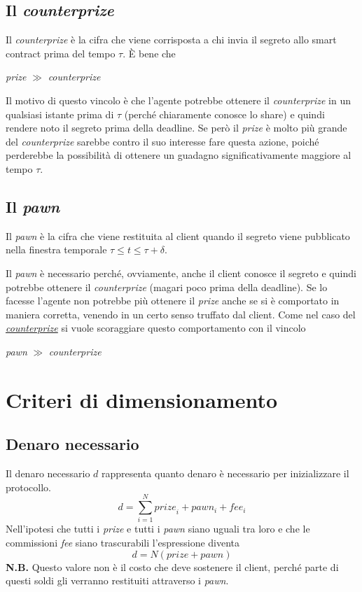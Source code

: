 \subsection{Il \textit{counterprize}}
\label{subsec:counterprize}
Il \textit{counterprize} è la cifra che viene corrisposta a chi invia il segreto
allo smart contract prima del tempo $ \tau $. È bene che
\begin{center}
	\textit{prize} $ \gg $ \textit{counterprize}
\end{center}
Il motivo di questo vincolo è che l'agente potrebbe ottenere
il \textit{counterprize} in un qualsiasi istante
prima di $ \tau $ (perché chiaramente conosce lo share) e quindi
rendere noto il segreto prima della deadline. Se però il
\textit{prize} è molto più grande del \textit{counterprize} sarebbe contro il suo
interesse fare questa azione,
poiché perderebbe la possibilità di ottenere un guadagno significativamente
maggiore al tempo $ \tau $.

\subsection{Il \textit{pawn}}
\label{subsec:pawn}
Il \textit{pawn} è la cifra che viene restituita al client quando il segreto
viene pubblicato nella finestra temporale $ \tau \leq t \leq \tau + \delta $.

Il \textit{pawn} è necessario perché, ovviamente, anche il client conosce il segreto
e quindi potrebbe ottenere il \textit{counterprize} (magari poco prima della deadline).
Se lo facesse l'agente non potrebbe più ottenere il \textit{prize} anche se si è
comportato in maniera corretta, venendo in un certo senso truffato dal client.
Come nel caso del \hyperref[subsec:counterprize]{\textit{counterprize}}
si vuole scoraggiare questo comportamento con il vincolo
\begin{center}
	\textit{pawn} $ \gg $ \textit{counterprize}
\end{center}

\section{Criteri di dimensionamento}

\subsection{Denaro necessario}
Il denaro necessario $ d $ rappresenta quanto denaro è necessario per inizializzare
il protocollo.
$$ d = \sum_{i=1}^{N} \textit{prize}_i + pawn_i + fee_i $$
Nell'ipotesi che tutti i \textit{prize} e tutti i \textit{pawn}
siano uguali tra loro e che le commissioni \textit{fee} siano trascurabili
l'espressione diventa
$$ d = N(prize + pawn) $$
\textbf{N.B.} Questo valore non è il costo che deve sostenere il client, perché parte
di questi soldi gli verranno restituiti attraverso i \textit{pawn}.

